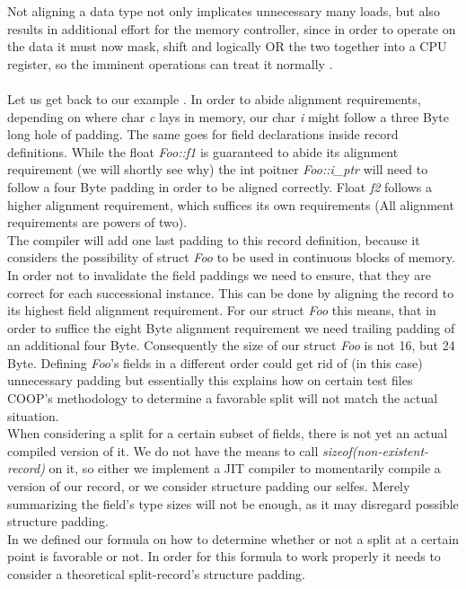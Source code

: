 Not aligning a data type not only implicates unnecessary many loads, but also results in additional effort for the memory controller, since in order to operate on the data it must now mask, shift and logically OR the two together into a CPU register, so the imminent operations can treat it normally .\\\\
Let us get back to our example . In order to abide alignment requirements, depending on where char \textit{c} lays in memory, our char \textit{i} might follow a three Byte long hole of padding. The same goes for field declarations inside record definitions. While the float \textit{Foo::f1} is guaranteed to abide its alignment requirement (we will shortly see why) the int poitner \textit{Foo::i\_ptr} will need to follow a four Byte padding in order to be aligned correctly. Float \textit{f2} follows a higher alignment requirement, which suffices its own requirements (All alignment requirements are powers of two).\\
The compiler will add one last padding to this record definition, because it considers the possibility of struct \textit{Foo} to be used in continuous blocks of memory. In order not to invalidate the field paddings we need to ensure, that they are correct for each successional instance. This can be done by aligning the record to its highest field alignment requirement. For our struct \textit{Foo} this means, that in order to suffice the eight Byte alignment requirement we need trailing padding of an additional four Byte. Consequently the size of our struct \textit{Foo} is not 16, but 24 Byte. Defining \textit{Foo}'s fields in a different order could get rid of (in this case) unnecessary padding but essentially this explains how on certain test files COOP's methodology to determine a favorable split will not match the actual situation.\\
When considering a split for a certain subset of fields, there is not yet an actual compiled version of it. We do not have the means to call \textit{sizeof(non-existent-record)} on it, so either we implement a JIT compiler to momentarily compile a version of our record, or we consider structure padding our selfes. Merely summarizing the field's type sizes will not be enough, as it may disregard possible structure padding.\\
In  we defined our formula on how to determine whether or not a split at a certain point is favorable or not. In order for this formula to work properly it needs to consider a theoretical split-record's structure padding.\\
